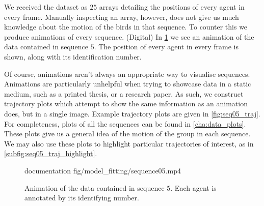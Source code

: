 We received the dataset as $25$ arrays detailing the positions of every agent in every frame. 
Manually inspecting an array, however, does not give us much knowledge about the motion of the birds 
in that sequence. To counter this we produce animations of every sequence. (Digital) In 
\cref{anim:sequence05} we see an animation of the data contained in sequence $5$. The position of 
every agent in every frame is shown, along with its identification number.

Of course, animations aren't always an appropriate way to visualise sequences. Animations are 
particularly unhelpful when trying to showcase data in a static medium, such as a printed thesis, or 
a research paper. As such, we construct trajectory plots which attempt to show the same information 
as an animation does, but in a single image. Example trajectory plots are given in 
\cref{fig:seq05_traj}. For completeness, plots of all the sequences can be found in 
\cref{cha:data_plots}. These plots give us a general idea of the motion of the group in each 
sequence. We may also use these plots to highlight particular trajectories of interest, as in 
\cref{subfig:seq05_traj_highlight}. 

\begin{figure}[!tbp]
	\centering
documentation
				 {\textwidth}{\textwidth}{fig/model_fitting/sequence05.mp4}
	\vspace{-190pt}
	\caption{Animation of the data contained in sequence $5$. Each agent is annotated by its identifying 
number.}
	\label{anim:sequence05}
\end{figure}

